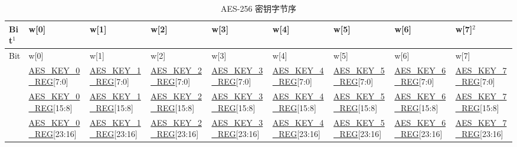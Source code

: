 \documentclass[main\_\_CN.tex]{subfiles}
\begin{document}
\begin{landscape}

\begin{threeparttable}

\begin{longtable}[c]
{ |l|l|l|l|l|l|l|l|l|}
\caption{AES-256 密钥字节序}\label{tab:aes-256-key-endian}\\
\hline
\rowcolor{lightgray}
Bit$^1$ &   w[0]    &   w[1]    &   w[2]    &   w[3]    &   w[4]    &   w[5]&   w[6]    &   w[7]$^2$    \\\hline
\endfirsthead
\hline
\rowcolor{lightgray}
Bit &   w[0]    &   w[1]    &   w[2]    &   w[3]    &   w[4]    &   w[5]&   w[6]    &   w[7]    \\\hline
\endhead
\endfoot
[31:24]     &   \scriptsize \hyperref[regdesc:AESKEYnREG]{AES\_KEY\_0\_REG}[7:0]    &   \scriptsize \hyperref[regdesc:AESKEYnREG]{AES\_KEY\_1\_REG}[7:0]    &   \scriptsize \hyperref[regdesc:AESKEYnREG]{AES\_KEY\_2\_REG}[7:0]    &   \scriptsize \hyperref[regdesc:AESKEYnREG]{AES\_KEY\_3\_REG}[7:0]    &   \scriptsize \hyperref[regdesc:AESKEYnREG]{AES\_KEY\_4\_REG}[7:0]    &   \scriptsize \hyperref[regdesc:AESKEYnREG]{AES\_KEY\_5\_REG}[7:0]
& \scriptsize  \hyperref[regdesc:AESKEYnREG]{AES\_KEY\_6\_REG}[7:0]    &   \scriptsize \hyperref[regdesc:AESKEYnREG]{AES\_KEY\_7\_REG}[7:0]\\ \hline
[23:16]     &   \scriptsize \hyperref[regdesc:AESKEYnREG]{AES\_KEY\_0\_REG}[15:8]   &   \scriptsize \hyperref[regdesc:AESKEYnREG]{AES\_KEY\_1\_REG}[15:8]   &   \scriptsize \hyperref[regdesc:AESKEYnREG]{AES\_KEY\_2\_REG}[15:8]   &   \scriptsize \hyperref[regdesc:AESKEYnREG]{AES\_KEY\_3\_REG}[15:8]   &   \scriptsize \hyperref[regdesc:AESKEYnREG]{AES\_KEY\_4\_REG}[15:8]   &   \scriptsize \hyperref[regdesc:AESKEYnREG]{AES\_KEY\_5\_REG}[15:8]   &   \scriptsize \hyperref[regdesc:AESKEYnREG]{AES\_KEY\_6\_REG}[15:8]   &   \scriptsize \hyperref[regdesc:AESKEYnREG]{AES\_KEY\_7\_REG}[15:8]\\ \hline
[15:8]  &  \scriptsize \hyperref[regdesc:AESKEYnREG]{AES\_KEY\_0\_REG}[23:16]  &   \scriptsize \hyperref[regdesc:AESKEYnREG]{AES\_KEY\_1\_REG}[23:16]  &   \scriptsize \hyperref[regdesc:AESKEYnREG]{AES\_KEY\_2\_REG}[23:16]  &   \scriptsize \hyperref[regdesc:AESKEYnREG]{AES\_KEY\_3\_REG}[23:16]  &   \scriptsize \hyperref[regdesc:AESKEYnREG]{AES\_KEY\_4\_REG}[23:16]  &   \scriptsize \hyperref[regdesc:AESKEYnREG]{AES\_KEY\_5\_REG}[23:16]& \scriptsize \hyperref[regdesc:AESKEYnREG]{AES\_KEY\_6\_REG}[23:16]  &   \scriptsize \hyperref[regdesc:AESKEYnREG]{AES\_KEY\_7\_REG}[23:16]\\ \hline

\end{longtable}
\end{threeparttable}
\end{landscape}
\end{document}
